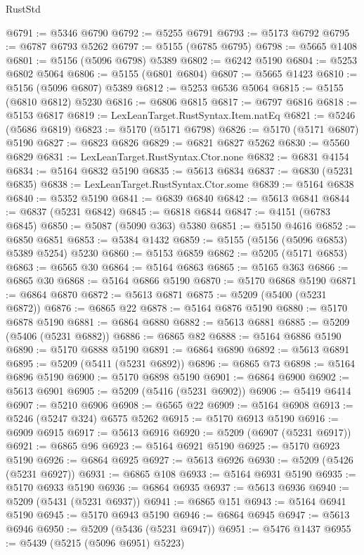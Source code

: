 \begin{lexlean}{RustStd}
\begin{coremodule}
@6791 := @5346 @6790
@6792 := @5255 @6791
@6793 := @5173 @6792
@6795 := @6787 @6793 @5262
@6797 := @5155 (@6785 @6795)
@6798 := @5665 @1408
@6801 := @5156 (@5096 @6798) @5389
@6802 := @6242 @5190
@6804 := @5253 @6802 @5064
@6806 := @5155 (@6801 @6804)
@6807 := @5665 @1423
@6810 := @5156 (@5096 @6807) @5389
@6812 := @5253 @6536 @5064
@6815 := @5155 (@6810 @6812) @5230
@6816 := @6806 @6815
@6817 := @6797 @6816
@6818 := @5153 @6817
@6819 := LexLeanTarget.RustSyntax.Item.natEq
@6821 := @5246 (@5686 @6819)
@6823 := @5170 (@5171 @6798)
@6826 := @5170 (@5171 @6807) @5190
@6827 := @6823 @6826
@6829 := @6821 @6827 @5262
@6830 := @5560 @6829
@6831 := LexLeanTarget.RustSyntax.Ctor.none
@6832 := @6831 @4154
@6834 := @5164 @6832 @5190
@6835 := @5613 @6834
@6837 := @6830 (@5231 @6835)
@6838 := LexLeanTarget.RustSyntax.Ctor.some
@6839 := @5164 @6838
@6840 := @5352 @5190
@6841 := @6839 @6840
@6842 := @5613 @6841
@6844 := @6837 (@5231 @6842)
@6845 := @6818 @6844
@6847 := @4151 (@6783 @6845)
@6850 := @5087 (@5090 @363) @5380
@6851 := @5150 @4616
@6852 := @6850 @6851
@6853 := @5384 @1432
@6859 := @5155 (@5156 (@5096 @6853) @5389 @5254) @5230
@6860 := @5153 @6859
@6862 := @5205 (@5171 @6853)
@6863 := @6565 @30
@6864 := @5164 @6863
@6865 := @5165 @363
@6866 := @6865 @30
@6868 := @5164 @6866 @5190
@6870 := @5170 @6868 @5190
@6871 := @6864 @6870
@6872 := @5613 @6871
@6875 := @5209 (@5400 (@5231 @6872))
@6876 := @6865 @22
@6878 := @5164 @6876 @5190
@6880 := @5170 @6878 @5190
@6881 := @6864 @6880
@6882 := @5613 @6881
@6885 := @5209 (@5406 (@5231 @6882))
@6886 := @6865 @82
@6888 := @5164 @6886 @5190
@6890 := @5170 @6888 @5190
@6891 := @6864 @6890
@6892 := @5613 @6891
@6895 := @5209 (@5411 (@5231 @6892))
@6896 := @6865 @73
@6898 := @5164 @6896 @5190
@6900 := @5170 @6898 @5190
@6901 := @6864 @6900
@6902 := @5613 @6901
@6905 := @5209 (@5416 (@5231 @6902))
@6906 := @5419 @6414
@6907 := @5210 @6906
@6908 := @6565 @22
@6909 := @5164 @6908
@6913 := @5246 (@5247 @324) @6575 @5262
@6915 := @5170 @6913 @5190
@6916 := @6909 @6915
@6917 := @5613 @6916
@6920 := @5209 (@6907 (@5231 @6917))
@6921 := @6865 @96
@6923 := @5164 @6921 @5190
@6925 := @5170 @6923 @5190
@6926 := @6864 @6925
@6927 := @5613 @6926
@6930 := @5209 (@5426 (@5231 @6927))
@6931 := @6865 @108
@6933 := @5164 @6931 @5190
@6935 := @5170 @6933 @5190
@6936 := @6864 @6935
@6937 := @5613 @6936
@6940 := @5209 (@5431 (@5231 @6937))
@6941 := @6865 @151
@6943 := @5164 @6941 @5190
@6945 := @5170 @6943 @5190
@6946 := @6864 @6945
@6947 := @5613 @6946
@6950 := @5209 (@5436 (@5231 @6947))
@6951 := @5476 @1437
@6955 := @5439 (@5215 (@5096 @6951) @5223)

\end{coremodule}
\end{lexlean}
